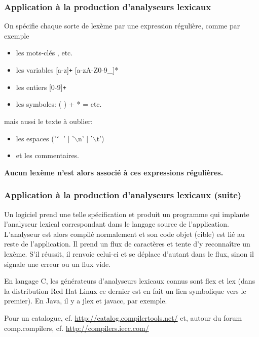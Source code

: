 %
\begin{frame}
\frametitle{Application à la production d'analyseurs lexicaux}

On spécifie chaque sorte de lexème par une expression régulière, comme
par exemple
\begin{itemize}

  \item les mots-clés \Xlet, \Xin etc.

  \item les variables \textsf{[a-z]\texttt{+} [a-zA-Z0-9\_]*}

  \item les entiers \textsf{[0-9]\texttt{+}}

  \item les symboles: \textsf{(} \textsf{)} \textsf{+} \textsf{*}
  \textsf{=} etc.

\end{itemize}
mais aussi le texte à oublier:
\begin{itemize}

  \item les espaces \textsf{('{\tt\char`\ }' \(\lvert\)
    '\(\backslash\){n}' \(\lvert\) '\(\backslash\)t')}

  \item et les commentaires.

\end{itemize}

\textbf{Aucun lexème n'est alors associé à ces expressions régulières.}

\end{frame}

%
\begin{frame}
\frametitle{Application à la production d'analyseurs lexicaux (suite)}

Un logiciel prend une telle spécification et produit un programme qui
implante l'analyseur lexical correspondant dans le langage source de
l'application. L'analyseur est alors compilé normalement et son code
objet (cible) est lié au reste de l'application. Il prend un flux de
caractères et tente d'y reconnaître un lexème. S'il réussit, il
renvoie celui-ci et se déplace d'autant dans le flux, sinon il signale
une erreur ou un flux vide.

\bigskip

En langage C, les générateurs d'analyseurs lexicaux connus sont
\textsf{flex} et \textsf{lex} (dans la distribution Red Hat Linux ce
dernier est en fait un lien symbolique vers le premier). En Java, il y
a \textsf{jlex} et \textsf{javacc}, par exemple.

Pour un catalogue, cf. \url{http://catalog.compilertools.net/} et,
autour du forum \textsf{comp.compilers},
cf. \url{http://compilers.iecc.com/}

\end{frame}

